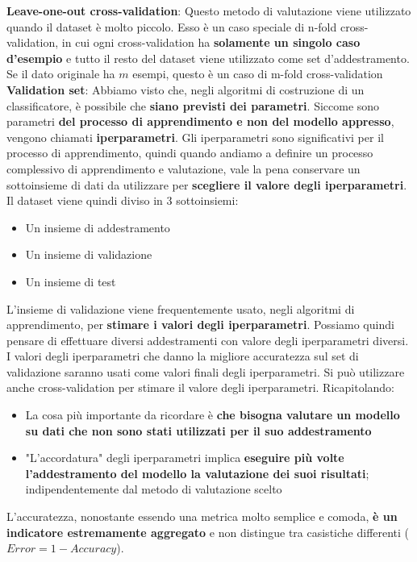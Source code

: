 \documentclass[12pt]{article}
\begin{document}
\textbf{Leave-one-out cross-validation}: \newline
Questo metodo di valutazione viene utilizzato quando il dataset è molto piccolo.
Esso è un caso speciale di n-fold cross-validation, in cui ogni cross-validation ha \textbf{solamente un singolo caso d'esempio} e tutto il resto del dataset viene utilizzato come set d'addestramento.
Se il dato originale ha $m$ esempi, questo è un caso di m-fold cross-validation \newline
\textbf{Validation set}: \newline
Abbiamo visto che, negli algoritmi di costruzione di un classificatore, è possibile che \textbf{siano previsti dei parametri}.
Siccome sono parametri \textbf{del processo di apprendimento e non del modello appresso}, vengono chiamati \textbf{iperparametri}.
Gli iperparametri sono significativi per il processo di apprendimento, quindi quando andiamo a definire un processo complessivo di apprendimento e valutazione, vale la pena
conservare un sottoinsieme di dati da utilizzare per \textbf{scegliere il valore degli iperparametri}.
Il dataset viene quindi diviso in 3 sottoinsiemi:
\begin{itemize}
    \item Un insieme di addestramento
    \item Un insieme di validazione
    \item Un insieme di test
\end{itemize}
L'insieme di validazione viene frequentemente usato, negli algoritmi di apprendimento, per \textbf{stimare i valori degli iperparametri}.
Possiamo quindi pensare di effettuare diversi addestramenti con valore degli iperparametri diversi. I valori degli iperparametri che danno la migliore accuratezza sul set di validazione saranno usati come valori finali degli iperparametri.
Si può utilizzare anche cross-validation per stimare il valore degli iperparametri. \newline
Ricapitolando:
\begin{itemize}
    \item La cosa più importante da ricordare è \textbf{che bisogna valutare un modello su dati che non sono stati utilizzati per il suo addestramento}
    \item "L'accordatura" degli iperparametri implica \textbf{eseguire più volte l'addestramento del modello la valutazione dei suoi risultati}; indipendentemente dal metodo di valutazione scelto 
\end{itemize}
L'accuratezza, nonostante essendo una metrica molto semplice e comoda, \textbf{è un indicatore estremamente aggregato} e non distingue tra casistiche differenti ($Error = 1 - Accuracy$).
\end{document}
